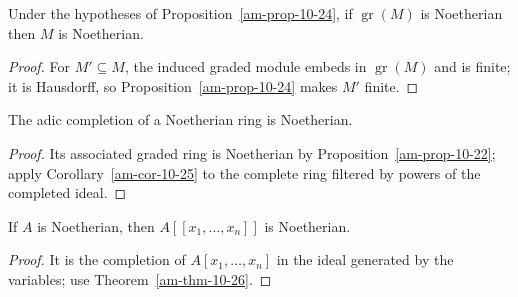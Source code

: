 \begin{corollary}
\label{am-cor-10-25}
\uses{}
Under the hypotheses of Proposition~\ref{am-prop-10-24}, if
$\operatorname{gr}(M)$ is Noetherian then $M$ is Noetherian.
\end{corollary}
\begin{proof}
For $M'\subseteq M$, the induced graded module embeds in $\operatorname{gr}(M)$
and is finite; it is Hausdorff, so Proposition~\ref{am-prop-10-24} makes $M'$ finite.
\end{proof}
\begin{theorem}
\label{am-thm-10-26}
\uses{}
The adic completion of a Noetherian ring is Noetherian.
\end{theorem}
\begin{proof}
Its associated graded ring is Noetherian by Proposition~\ref{am-prop-10-22};
apply Corollary~\ref{am-cor-10-25} to the complete ring filtered by powers of
the completed ideal.
\end{proof}
\begin{corollary}
\label{am-cor-10-27}
\uses{}
If $A$ is Noetherian, then $A[[x_1,\ldots,x_n]]$ is Noetherian.
\end{corollary}
\begin{proof}
It is the completion of $A[x_1,\ldots,x_n]$ in the ideal generated by the
variables; use Theorem~\ref{am-thm-10-26}.
\end{proof}
